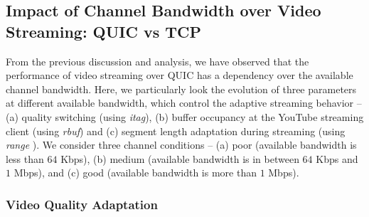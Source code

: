 \subsection{Impact of Channel Bandwidth over Video Streaming: QUIC vs TCP}
From the previous discussion and analysis, we have observed that the performance of video streaming over QUIC has a dependency over the available channel bandwidth. 
Here, we particularly look the evolution of three parameters at different available bandwidth, which control the adaptive streaming behavior -- (a) quality switching (using \textit{itag}), (b) buffer occupancy at the YouTube streaming client (using \textit{rbuf}) and (c) segment length adaptation during streaming (using \textit{range} ). We consider three channel conditions -- (a) poor (available bandwidth is less than $64$ Kbps), (b) medium (available bandwidth is in between $64$ Kbps and $1$ Mbps), and (c) good (available bandwidth is more than $1$ Mbps).

\subsubsection{Video Quality Adaptation}
%
%
%
%
%




